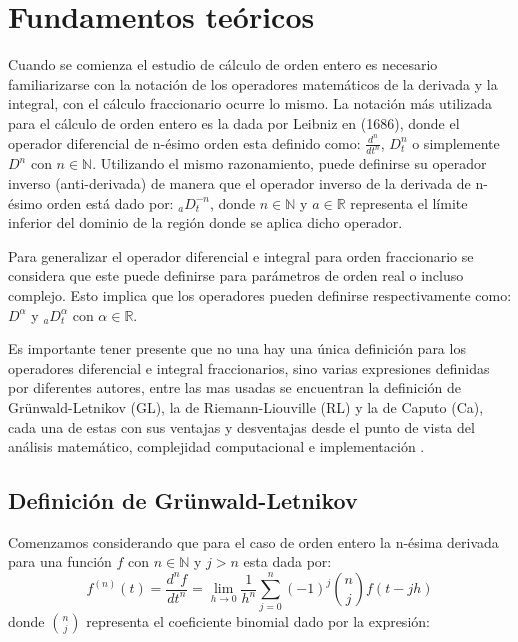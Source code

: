 \chapter{Fundamentos teóricos}		

	Cuando se comienza el estudio de cálculo de orden entero es necesario familiarizarse con la notación de los operadores matemáticos de la derivada y la integral, con el cálculo fraccionario ocurre lo mismo. La notación más utilizada para el cálculo de orden entero es la dada por Leibniz en (1686), donde el operador diferencial de n-ésimo orden esta definido como: $\frac{d^{n}}{dt^{n}}$, $D_{t}^{n}$ o simplemente $D^{n}$ con $n \in \mathbb{N}$. Utilizando el mismo razonamiento, puede definirse su operador inverso (anti-derivada) de manera que el operador inverso de la derivada de n-ésimo orden está dado por: $_{a}D^{-n}_{t}$, donde $n \in \mathbb{N}$ y $a \in \mathbb{R}$ representa el límite inferior del dominio de la región donde se aplica dicho operador.
			
	Para generalizar el operador diferencial e integral para orden fraccionario se considera que este puede definirse para parámetros de orden real o incluso complejo. Esto implica que los operadores pueden definirse respectivamente como: $D^{\alpha}$ y $_{a}D^{\alpha}_{t}$ con $ \alpha \in \mathbb{R}$. 
		
	Es importante tener presente que no una hay una única definición para los operadores diferencial e integral fraccionarios, sino varias expresiones definidas por diferentes autores, entre las mas usadas se encuentran la definición de Grünwald-Letnikov (GL), la de Riemann-Liouville (RL) y la de Caputo (Ca), cada una de estas con sus ventajas y desventajas desde el punto de vista del análisis matemático, complejidad computacional e implementación \cite{Petras2011}.
			
	\section{Definición de Grünwald-Letnikov}

	Comenzamos considerando que para el caso de orden entero la n-ésima derivada para una función $f$ con $n \in \mathbb{N}$ y $j>n$ esta dada por:
	\begin{equation}
		f^{(n)}(t) = \frac{d^{n}f}{dt^{n}} = \lim_{h \to 0 } \frac{1}{h^{n}} \sum_{j = 0}^{n} (-1)^{j} \binom{n}{j} f(t - jh)
		\label{ec:derivada_entera}
	\end{equation}
	donde $\binom{n}{j}$ representa el coeficiente binomial dado por la expresión:
			
